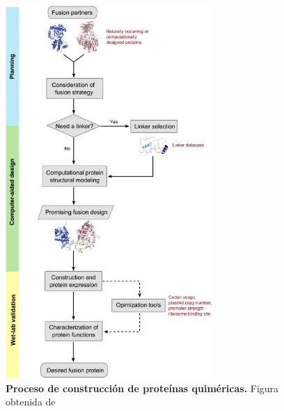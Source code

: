 \begin{figure}[htbp]
\centering
\includegraphics[width=0.7\textwidth]{img/esquemaProcesoFusion.jpg} 
\caption{\textbf{Proceso de construcción de proteínas quiméricas.} Figura obtenida de \cite{yu2015synthetic}}
\label{esquemaProcesoFusion}
\end{figure}

